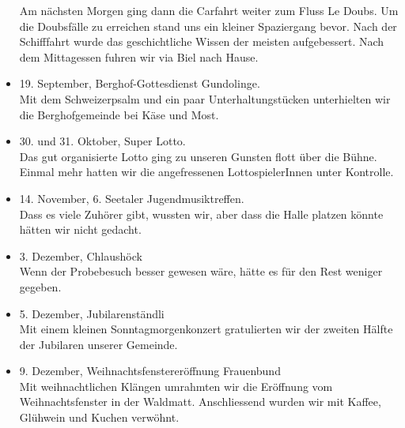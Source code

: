 \begin{history}
\begin{itemize}
              Am nächsten Morgen ging dann die Carfahrt weiter zum Fluss Le Doubs. Um
              die Doubsfälle zu erreichen stand uns ein kleiner Spaziergang bevor.
              Nach der Schifffahrt wurde das geschichtliche Wissen der meisten
              aufgebessert. Nach dem Mittagessen fuhren wir via Biel nach Hause.

        \item 19. September, Berghof-Gottesdienst Gundolinge.\\
              Mit dem Schweizerpsalm und ein paar
              Unterhaltungstücken unterhielten wir die  Berghofgemeinde bei Käse und
              Most.

        \item 30. und 31. Oktober, Super Lotto.\\
              Das gut organisierte Lotto ging zu
              unseren Gunsten flott über die Bühne. Einmal mehr hatten wir die
              angefressenen LottospielerInnen unter Kontrolle.

        \item 14. November, 6. Seetaler Jugendmusiktreffen.\\
              Dass es viele Zuhörer gibt, wussten wir, aber dass die Halle platzen
              könnte hätten wir nicht gedacht.

        \item 3. Dezember, Chlaushöck\\
              Wenn der Probebesuch besser gewesen wäre, hätte es für den
              Rest weniger gegeben.

        \item 5. Dezember, Jubilarenständli\\
              Mit einem kleinen Sonntagmorgenkonzert gratulierten wir der zweiten
              Hälfte der Jubilaren unserer Gemeinde.

        \item 9. Dezember, Weihnachtsfenstereröffnung Frauenbund\\
              Mit weihnachtlichen Klängen
              umrahmten wir die Eröffnung vom Weihnachtsfenster in der Waldmatt.
              Anschliessend wurden wir mit Kaffee, Glühwein und Kuchen verwöhnt.

    \end{itemize}

\end{history}
